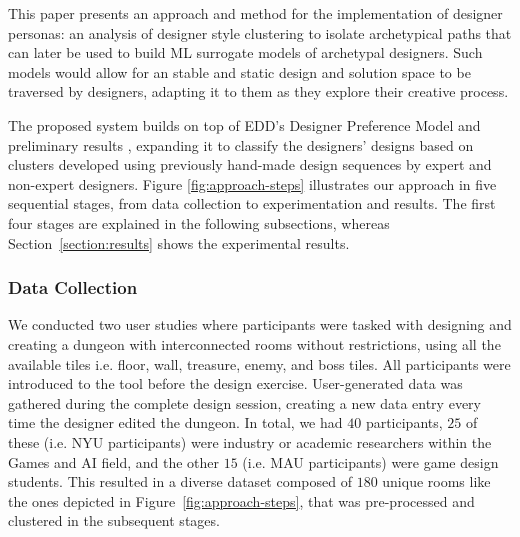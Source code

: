 

This paper presents an approach and method for the implementation of designer personas: an analysis of designer style clustering to isolate archetypical paths that can later be used to build ML surrogate models of archetypal designers. Such models would allow for an stable and static design and solution space to be traversed by designers, adapting it to them as they explore their creative process.


The proposed system builds on top of EDD's Designer Preference Model and preliminary results , expanding it to classify the designers' designs based on clusters developed using previously hand-made design sequences by expert and non-expert designers. Figure \ref{fig:approach-steps} illustrates our approach in five sequential stages, from data collection to experimentation and results. The first four stages are explained in the following subsections, whereas Section~\ref{section:results} shows the experimental results.

\subsubsection{Data Collection}

We conducted two user studies where participants were tasked with designing and creating a dungeon with interconnected rooms without restrictions, using all the available tiles i.e. floor, wall, treasure, enemy, and boss tiles. All participants were introduced to the tool before the design exercise. User-generated data was gathered during the complete design session, creating a new data entry every time the designer edited the dungeon. In total, we had $40$ participants, $25$ of these (i.e. NYU participants) were industry or academic researchers within the Games and AI field, and the other $15$ (i.e. MAU participants) were game design students. This resulted in a diverse dataset composed of $180$ unique rooms like the ones depicted in Figure~\ref{fig:approach-steps}, that was pre-processed and clustered in the subsequent stages. 

